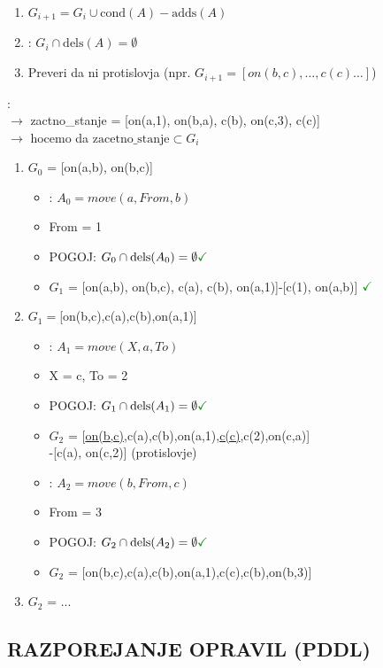 \begin{enumerate}[noitemsep,topsep=0pt,leftmargin=*]
\item $G_{i+1} = G_i \cup \text{cond}(A) - \text{adds}(A)$
\item {}: $G_{i} \cap \text{dels}(A) = \emptyset$
\item Preveri da ni protislovja (npr. $G_{i+1} = \left[on(b,c), \dots, c(c) \dots\right]$)
\end{enumerate}

:\\
$\rightarrow$ zactno\_stanje = [on(a,1), on(b,a), c(b), on(c,3), c(c)]\\
$\rightarrow$ hocemo da $\text{zacetno\_stanje} \subset G_i$
\begin{enumerate}[noitemsep,topsep=0pt,leftmargin=*,]
    \item $G_0$ = [on(a,b), on(b,c)]
    \begin{itemize}[noitemsep,topsep=0pt,leftmargin=0.5cm]
        \item {}: $A_0=move(a, From, b)$
        \item From = 1
        \item POGOJ: $G_0 \cap \text{dels}(A_0) = \emptyset \green{\checkmark}$
        \item $G_1$ = [on(a,b), on(b,c), c(a), c(b), on(a,1)]-[c(1), on(a,b)] $\green{\checkmark}$
    \end{itemize}
    \item $G_1=$[on(b,c),c(a),c(b),on(a,1)]
    \begin{itemize}[noitemsep,topsep=0pt,leftmargin=0.5cm]
        \item {}: $A_1=move(X, a, To)$
        \item X = c, To = 2
        \item POGOJ: $G_1 \cap \text{dels}(A_1) = \emptyset \green{\checkmark}$
        \item $G_2$ = [\underline{on(b,c)},c(a),c(b),on(a,1),\underline{c(c)},c(2),on(c,a)]\\ -[c(a), on(c,2)] \xmark (protislovje)
        \item {}: $A_2=move(b, From, c)$
        \item From = 3
        \item POGOJ: $G_2 \cap \text{dels}(A_2) = \emptyset \green{\checkmark}$
        \item $G_2$ = [on(b,c),c(a),c(b),on(a,1),c(c),c(b),on(b,3)] \cmark
    \end{itemize}
    \item $G_2$ = ...     
\end{enumerate}
\subsection{RAZPOREJANJE OPRAVIL (PDDL)}

